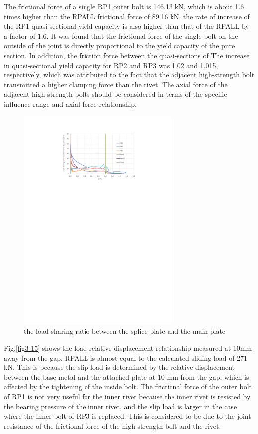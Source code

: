 The frictional force of a single RP1 outer bolt is 146.13 kN, which is about 1.6 times higher than the RPALL frictional force of 89.16 kN. the rate of increase of the RP1 quasi-sectional yield capacity is also higher than that of the RPALL by a factor of 1.6. It was found that the frictional force of the single bolt on the outside of the joint is directly proportional to the yield capacity of the pure section. In addition, the friction force between the quasi-sections of The increase in quasi-sectional yield capacity for RP2 and RP3 was 1.02 and 1.015, respectively, which was attributed to the fact that the adjacent high-strength bolt transmitted a higher clamping force than the rivet. The axial force of the adjacent high-strength bolts should be considered in terms of the specific influence range and axial force relationship.


\begin{figure}[htbp]
    \centering
    \includegraphics[width=0.7\textwidth]{imgs/ch3/fig3-13.pdf}
    \caption{the load sharing ratio between the splice plate and the main plate}
    \label{fig3-13}
\end{figure}

Fig.\ref{fig3-15} shows the load-relative displacement relationship measured at 10mm away from the gap, RPALL is almost equal to the calculated sliding load of 271 kN. This is because the slip load is determined by the relative displacement between the base metal and the attached plate at 10 mm from the gap, which is affected by the tightening of the inside bolt. The frictional force of the outer bolt of RP1 is not very useful for the inner rivet because the inner rivet is resisted by the bearing pressure of the inner rivet, and the slip load is larger in the case where the inner bolt of RP3 is replaced. This is considered to be due to the joint resistance of the frictional force of the high-strength bolt and the rivet.

